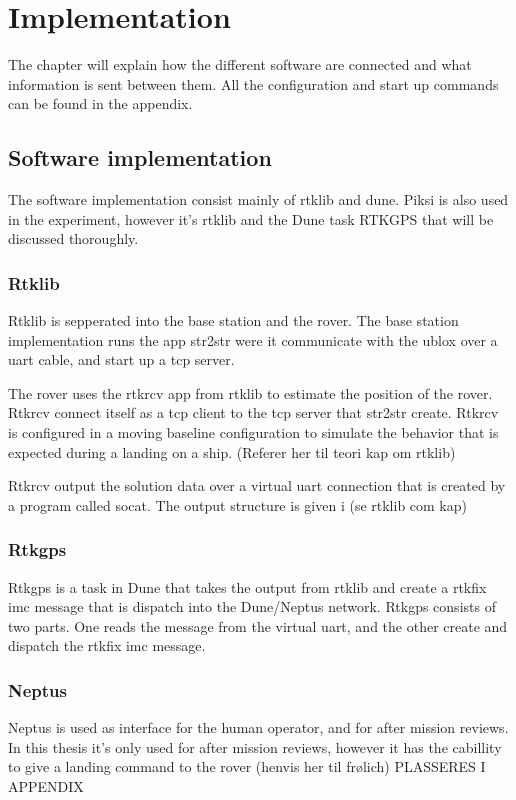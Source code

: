\chapter{Implementation}
The chapter will explain how the different software are connected and what information is sent between them. All the configuration and start up commands can be found in the appendix.
\section{Software implementation}
The software implementation consist mainly of rtklib and dune. Piksi is also used in the experiment, however it's rtklib and the Dune task RTKGPS that will be discussed thoroughly.
\subsection{Rtklib}
Rtklib is sepperated into the base station and the rover. The base station implementation runs the app str2str were it communicate with the ublox over a uart cable, and start up a tcp server.

The rover uses the rtkrcv app from rtklib to estimate the position of the rover. Rtkrcv connect itself as a tcp client to the tcp server that str2str create. Rtkrcv is configured in a moving baseline configuration to simulate the behavior that is expected during a landing on a ship. (Referer her til teori kap om rtklib)

Rtkrcv output the solution data over a virtual uart connection that is created by a program called socat. The output structure is given i (se rtklib com kap)
\subsection{Rtkgps}
Rtkgps is a task in Dune that takes the output from rtklib and create a rtkfix imc message that is dispatch into the Dune/Neptus network. Rtkgps consists of two parts. One reads the message from the virtual uart, and the other create and dispatch the rtkfix imc message.

\subsection{Neptus}
Neptus is used as interface for the human operator, and for after mission reviews. In this thesis it's only used for after mission reviews, however it has the cabillity to give a landing command to the rover (henvis her til frølich)
PLASSERES I APPENDIX
